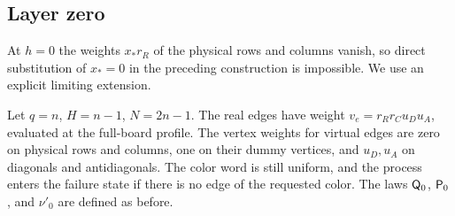 \subsection{Layer zero}\label{subsec:h0}

At $h=0$ the weights $x_*r_R$ of the physical rows and columns vanish, so direct substitution of $x_*=0$ in
the preceding construction
is impossible. We use an explicit limiting extension.

\begin{definicion}\label{def:referencia_cero} Let $q=n$, $H=n-1$, $N=2n-1$.
The real edges have weight
$v_e=r_Rr_Cu_Du_A$, evaluated at the full-board profile. The vertex weights for virtual edges are zero on
physical rows and columns,
one on their dummy vertices, and $u_D,u_A$ on diagonals and antidiagonals. The color word is still uniform,
and the process enters the
failure state if there is no edge of the requested color. The laws $\mathsf{Q}_0$, $\mathsf{P}_0$, and $\nu'_0$ are
defined as before.
\end{definicion}

